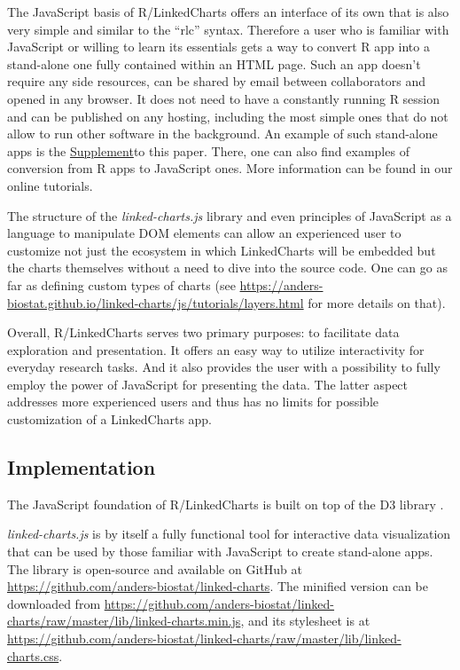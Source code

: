 \documentclass[twocolumn,10pt]{article}
\newcommand{\Supplement}{\href{https://anders-biostat.github.io/lc-paper/}{Supplement}}
\begin{document}
The JavaScript basis of R/LinkedCharts offers an interface of its own that is also very simple and similar to the ``rlc'' syntax. Therefore a user who is familiar with JavaScript or willing to learn its essentials gets a way to convert R app into a stand-alone one fully contained within an HTML page. Such an app doesn't require any side resources, can be shared by email between collaborators and opened in any browser. It does not need to have a constantly running R session and can be published on any hosting, including the most simple ones that do not allow to run other software in the background. An example of such stand-alone apps is the \Supplement to this paper. There, one can also find examples of conversion from R apps to JavaScript ones. More information can be found in our online tutorials.

The structure of the \emph{linked-charts.js} library and even principles of JavaScript as a language to manipulate DOM elements can allow an experienced user to customize not just the ecosystem in which LinkedCharts will be embedded but the charts themselves without a need to dive into the source code. One can go as far as defining custom types of charts (see \url{https://anders-biostat.github.io/linked-charts/js/tutorials/layers.html} for more details on that).

Overall, R/LinkedCharts serves two primary purposes: to facilitate data exploration and presentation. It offers an easy way to utilize interactivity for everyday research tasks. And it also provides the user with a possibility to fully employ the power of JavaScript for presenting the data. The latter aspect addresses more experienced users and thus has no limits for possible customization of a LinkedCharts app.


\subsection{Implementation}

The JavaScript foundation of R/LinkedCharts is built on top of the D3 library \citep{bostock_2011}. 

\emph{linked-charts.js} is by itself a fully functional tool for interactive data visualization that can be used by those familiar with JavaScript to create stand-alone apps. The library is open-source and available on GitHub at \url{https://github.com/anders-biostat/linked-charts}. The minified version can be downloaded from \url{https://github.com/anders-biostat/linked-charts/raw/master/lib/linked-charts.min.js}, and its stylesheet is at \url{https://github.com/anders-biostat/linked-charts/raw/master/lib/linked-charts.css}.
\end{document}
